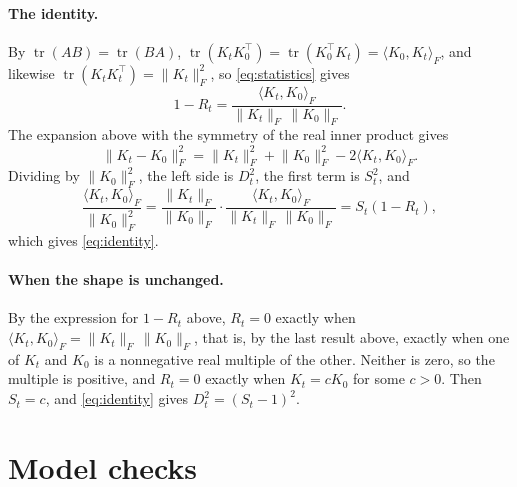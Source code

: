 \documentclass[a4paper,11pt]{article} %
\begin{document}
\paragraph{The identity.} By $\operatorname{tr}(AB)=\operatorname{tr}(BA)$,
$\operatorname{tr}(K_tK_0^\top)=\operatorname{tr}(K_0^\top K_t)
=\langle K_0,K_t\rangle_F$, and likewise
$\operatorname{tr}(K_tK_t^\top)=\lVert K_t\rVert_F^2$, so
\eqref{eq:statistics} gives
\begin{equation*}
  1-R_t = \frac{\langle K_t,K_0\rangle_F}{\lVert K_t\rVert_F\,\lVert
  K_0\rVert_F}.
\end{equation*}
The expansion above with the symmetry of the real inner product gives
\begin{equation*}
  \lVert K_t-K_0\rVert_F^2
  = \lVert K_t\rVert_F^2 + \lVert K_0\rVert_F^2
  - 2\langle K_t,K_0\rangle_F .
\end{equation*}
Dividing by $\lVert K_0\rVert_F^2$, the left side is $D_t^2$, the first term
is $S_t^2$, and
\begin{equation*}
  \frac{\langle K_t,K_0\rangle_F}{\lVert K_0\rVert_F^2}
  = \frac{\lVert K_t\rVert_F}{\lVert K_0\rVert_F}\cdot
  \frac{\langle K_t,K_0\rangle_F}{\lVert K_t\rVert_F\,\lVert K_0\rVert_F}
  = S_t(1-R_t),
\end{equation*}
which gives \eqref{eq:identity}.

\paragraph{When the shape is unchanged.} By the expression for $1-R_t$ above,
$R_t=0$ exactly when
$\langle K_t,K_0\rangle_F=\lVert K_t\rVert_F\,\lVert K_0\rVert_F$, that is,
by the last result above, exactly when one of $K_t$ and $K_0$ is a
nonnegative real multiple of the other. Neither is zero, so the multiple is
positive, and $R_t=0$ exactly when $K_t=cK_0$ for some $c>0$. Then
$S_t=c$, and \eqref{eq:identity} gives $D_t^2=(S_t-1)^2$.

\section{Model checks}
\end{document}

